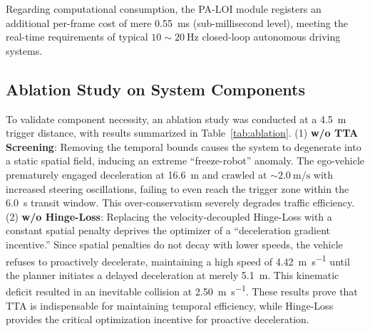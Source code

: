\documentclass[conference]{IEEEtran}
\begin{document}
Regarding computational consumption, the PA-LOI module registers an additional per-frame cost of mere \SI{0.55}{\milli\second} (sub-millisecond level), meeting the real-time requirements of typical $10\sim\SI{20}{\hertz}$ closed-loop autonomous driving systems.

\subsection{Ablation Study on System Components}
To validate component necessity, an ablation study was conducted at a \SI{4.5}{\meter} trigger distance, with results summarized in Table~\ref{tab:ablation}.
(1) \textbf{w/o TTA Screening}: Removing the temporal bounds causes the system to degenerate into a static spatial field, inducing an extreme ``freeze-robot'' anomaly. The ego-vehicle prematurely engaged deceleration at \SI{16.6}{\meter} and crawled at $\sim\!\SI{2.0}{\meter\per\second}$ with increased steering oscillations, failing to even reach the trigger zone within the \SI{6.0}{\second} transit window. This over-conservatism severely degrades traffic efficiency.
(2) \textbf{w/o Hinge-Loss}: Replacing the velocity-decoupled Hinge-Loss with a constant spatial penalty deprives the optimizer of a ``deceleration gradient incentive.'' Since spatial penalties do not decay with lower speeds, the vehicle refuses to proactively decelerate, maintaining a high speed of \SI{4.42}{\meter\per\second} until the planner initiates a delayed deceleration at merely \SI{5.1}{\meter}. This kinematic deficit resulted in an inevitable collision at \SI{2.50}{\meter\per\second}.
These results prove that TTA is indispensable for maintaining temporal efficiency, while Hinge-Loss provides the critical optimization incentive for proactive deceleration.

\begin{table}[htbp]
\caption{Ablation Study Results at \SI{4.5}{\meter} Trigger Distance}
\label{tab:ablation}
\centering
\renewcommand{\arraystretch}{1.15}
\end{table}
\end{document}
